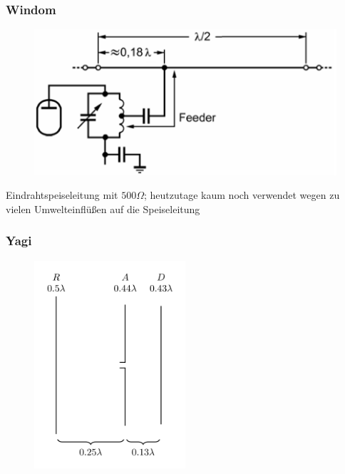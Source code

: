 \begin{frame}
  \frametitle{Windom}
  \begin{center}
    \begin{figure}
      \includegraphics[width=1\textwidth,height=.75\textheight,keepaspectratio]{a09/WINDOM_TH130.png}
    \end{figure}
  \end{center}
  Eindrahtspeiseleitung mit $500 \Omega$; heutzutage kaum noch verwendet wegen zu vielen Umwelteinflüßen auf die Speiseleitung
\end{frame}

\begin{frame}
  \frametitle{Yagi}
  \begin{center}
    \begin{figure}
      \includegraphics[width=0.5\textwidth,height=.75\textheight,keepaspectratio]{a09/Yagi_3_element.png}
    \end{figure}
  \end{center}
\end{frame}

